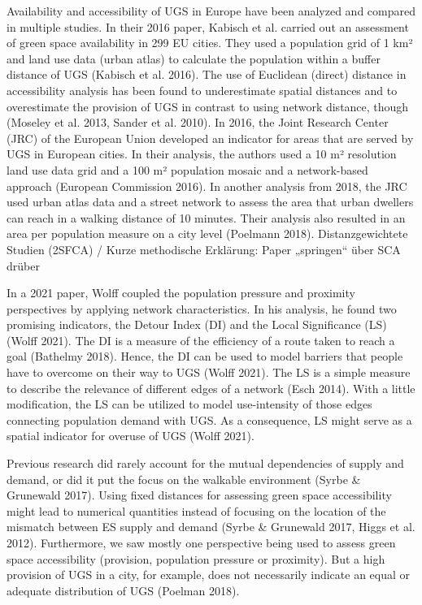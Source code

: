\documentclass[10pt]{article}
\begin{document}
Availability and accessibility of UGS in Europe have been analyzed and compared in multiple studies.
In their 2016 paper, Kabisch et al. carried out an assessment of green space availability in 299 EU cities. They used a population grid of 1 km² and land use data (urban atlas) to calculate the population within a buffer distance of UGS (Kabisch et al. 2016).
The use of Euclidean (direct) distance in accessibility analysis has been found to underestimate spatial distances and to overestimate the provision of UGS in contrast to using network distance, though (Moseley et al. 2013, Sander et al. 2010).
In 2016, the Joint Research Center (JRC) of the European Union developed an indicator for areas that are served by UGS in European cities. In their analysis, the authors used a 10 m² resolution land use data grid and a 100 m² population mosaic and a network-based approach (European Commission 2016).
In another analysis from 2018, the JRC used urban atlas data and a street network to assess the area that urban dwellers can reach in a walking distance of 10 minutes. Their analysis also resulted in an area per population measure on a city level (Poelmann 2018).
Distanzgewichtete Studien (2SFCA) / Kurze methodische Erklärung: Paper „springen“ über SCA drüber

In a 2021 paper, Wolff coupled the population pressure and proximity perspectives by applying network characteristics. In his analysis, he found two promising indicators, the Detour Index (DI) and the Local Significance (LS) (Wolff 2021).
The DI is a measure of the efficiency of a route taken to reach a goal (Bathelmy 2018).
Hence, the DI can be used to model barriers that people have to overcome on their way to UGS (Wolff 2021).
The LS is a simple measure to describe the relevance of different edges of a network (Esch 2014).
With a little modification, the LS can be utilized to model use-intensity of those edges connecting population demand with UGS. As a consequence, LS might serve as a spatial indicator for overuse of UGS (Wolff 2021). 

Previous research did rarely account for the mutual dependencies of supply and demand, or did it put the focus on the walkable environment (Syrbe \& Grunewald 2017).
Using fixed distances for assessing green space accessibility might lead to numerical quantities instead of focusing on the location of the mismatch between ES supply and demand (Syrbe \& Grunewald 2017, Higgs et al. 2012).
Furthermore, we saw mostly one perspective being used to assess green space accessibility (provision, population pressure or proximity).
But a high provision of UGS in a city, for example, does not necessarily indicate an equal or adequate distribution of UGS (Poelman 2018).
\end{document}
